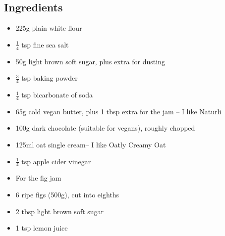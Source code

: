 \documentclass{book}
\begin{document}
\subsection*{Ingredients}
\begin{itemize}
\item 225g plain white flour
\item $\frac{1}{4}$ tsp fine sea salt
\item 50g light brown soft sugar, plus extra for dusting
\item $\frac{3}{4}$ tsp baking powder
\item $\frac{1}{4}$ tsp bicarbonate of soda
\item 65g cold vegan butter, plus 1 tbsp extra for the jam – I like Naturli
\item 100g dark chocolate (suitable for vegans), roughly chopped
\item 125ml oat single cream– I like Oatly Creamy Oat
\item $\frac{1}{4}$ tsp apple cider vinegar
\end{itemize}

\begin{itemize}
\item For the fig jam
\item 6 ripe figs (500g), cut into eighths
\item 2 tbsp light brown soft sugar
\item 1 tsp lemon juice
\end{itemize}
\end{document}
